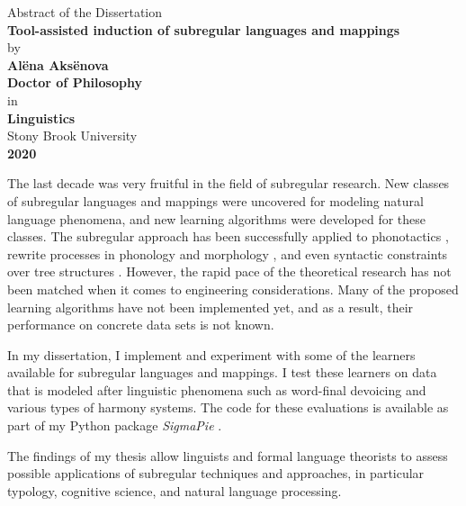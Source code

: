 \begin{center}
Abstract of the Dissertation \\ \vspace{1em}
\textbf{Tool-assisted induction of subregular languages and mappings} \\ \vspace{1em}
by \\ \vspace{1em}
\textbf{Al\"ena Aks\"enova} \\ \vspace{1em}
\textbf{Doctor of Philosophy} \\ \vspace{1em}
in \\ \vspace{1em}
\textbf{Linguistics} \\ \vspace{1em}
Stony Brook University \\ \vspace{1em}
\textbf{2020} \\ \vspace{3em}
\end{center}



The last decade was very fruitful in the field of subregular research.
New classes of subregular languages and mappings were uncovered for modeling natural language phenomena, and new learning algorithms were developed for these classes.
The subregular approach has been successfully applied to phonotactics \citep{Heinz10ldp}, rewrite processes in phonology and morphology \citep{Chandlee2014}, and even syntactic constraints over tree structures \citep{Graf18CLS}.
However, the rapid pace of the theoretical research has not been matched when it comes to engineering considerations.
Many of the proposed learning algorithms have not been implemented yet, and as a result, their performance on concrete data sets is not known.

In my dissertation, I implement and experiment with some of the learners available for subregular languages and mappings.
I test these learners on data that is modeled after linguistic phenomena such as word-final devoicing and various types of harmony systems.
The code for these evaluations is available as part of my Python package \emph{SigmaPie} \href{https://pypi.org/project/SigmaPie/}{\faCube} \citep{sigmapie}.

The findings of my thesis allow linguists and formal language theorists to assess possible applications of subregular techniques and approaches, in particular typology, cognitive science, and natural language processing.